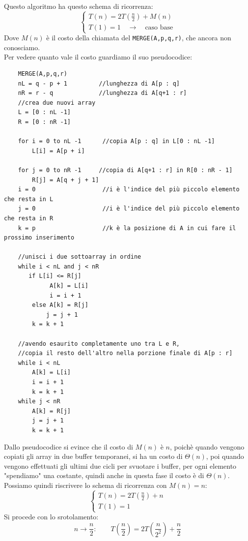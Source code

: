 \noindent Questo algoritmo ha questo schema di ricorrenza:
$$\begin{cases}
    \displaystyle T(n)=2T\left(\frac{n}{2}\right)+M(n)\\
    T(1) = 1 \quad \to \quad \text{caso base}
\end{cases}$$
Dove $M(n)$ è il costo della chiamata del \texttt{MERGE(A,p,q,r)}, che ancora non conosciamo.\\
Per vedere quanto vale il costo guardiamo il suo pseudocodice:
\begin{verbatim}
    MERGE(A,p,q,r)
    nL = q - p + 1         //lunghezza di A[p : q]
    nR = r - q             //lunghezza di A[q+1 : r]
    //crea due nuovi array 
    L = [0 : nL -1]
    R = [0 : nR -1]
    
    for i = 0 to nL -1      //copia A[p : q] in L[0 : nL -1]
        L[i] = A[p + i]
        
    for j = 0 to nR -1     //copia di A[q+1 : r] in R[0 : nR - 1]
        R[j] = A[q + j + 1]
    i = 0                   //i è l'indice del più piccolo elemento che resta in L
    j = 0                   //i è l'indice del più piccolo elemento che resta in R
    k = p                   //k è la posizione di A in cui fare il prossimo inserimento

    //unisci i due sottoarray in ordine
    while i < nL and j < nR
       if L[i] <= R[j]
             A[k] = L[i]
             i = i + 1
        else A[k] = R[j]
            j = j + 1
        k = k + 1
    
    //avendo esaurito completamente uno tra L e R,
    //copia il resto dell'altro nella porzione finale di A[p : r]
    while i < nL
        A[k] = L[i]
        i = i + 1
        k = k + 1
    while j < nR
        A[k] = R[j]
        j = j + 1
        k = k + 1
\end{verbatim}
\noindent Dallo pseudocodice si evince che il costo di $M(n)$ è $n$, poichè quando vengono copiati gli array in due buffer temporanei, si ha un costo di $\Theta (n)$, poi quando vengono effettuati gli ultimi due cicli per svuotare i buffer, per ogni elemento "spendiamo" una costante, quindi anche in questa fase il costo è di $\Theta(n)$.\smallskip\\
Possiamo quindi riscrivere lo schema di ricorrenza con $M(n) = n$:
$$
\begin{cases}
\displaystyle T(n)=2T\left(\frac{n}{2}\right)+n \\
T(1)=1
\end{cases}
$$
Si procede con lo srotolamento:
$$n\to \frac{n}{2}:\qquad T\left(\frac{n}{2}\right) = 2T\left(\frac{n}{2^2}\right)+\frac{n}{2}$$
